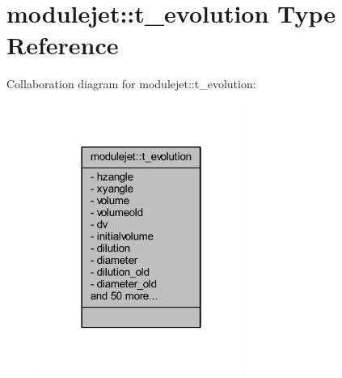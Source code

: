 \hypertarget{structmodulejet_1_1t__evolution}{}\section{modulejet\+:\+:t\+\_\+evolution Type Reference}
\label{structmodulejet_1_1t__evolution}


Collaboration diagram for modulejet\+:\+:t\+\_\+evolution\+:\nopagebreak
\begin{figure}[H]
\begin{center}
\leavevmode
\includegraphics[width=190pt]{structmodulejet_1_1t__evolution__coll__graph}
\end{center}
\end{figure}
